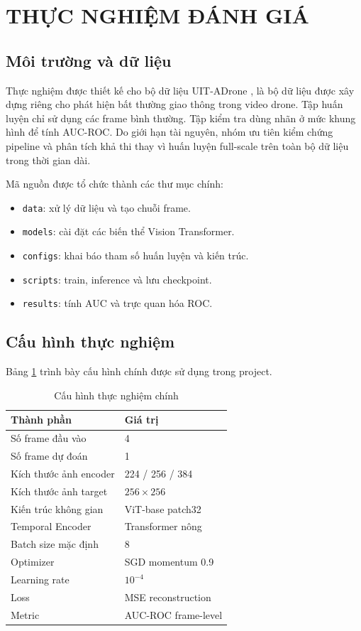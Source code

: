 \section{THỰC NGHIỆM ĐÁNH GIÁ}

\subsection{Môi trường và dữ liệu}

Thực nghiệm được thiết kế cho bộ dữ liệu UIT-ADrone \cite{c2}, là bộ dữ liệu được xây dựng riêng cho phát hiện bất thường giao thông trong video drone. Tập huấn luyện chỉ sử dụng các frame bình thường. Tập kiểm tra dùng nhãn ở mức khung hình để tính AUC-ROC. Do giới hạn tài nguyên, nhóm ưu tiên kiểm chứng pipeline và phân tích khả thi thay vì huấn luyện full-scale trên toàn bộ dữ liệu trong thời gian dài.

Mã nguồn được tổ chức thành các thư mục chính:
\begin{itemize}
    \item \texttt{data}: xử lý dữ liệu và tạo chuỗi frame.
    \item \texttt{models}: cài đặt các biến thể Vision Transformer.
    \item \texttt{configs}: khai báo tham số huấn luyện và kiến trúc.
    \item \texttt{scripts}: train, inference và lưu checkpoint.
    \item \texttt{results}: tính AUC và trực quan hóa ROC.
\end{itemize}

\subsection{Cấu hình thực nghiệm}

Bảng \ref{tab:config} trình bày cấu hình chính được sử dụng trong project.

\begin{table}[h]
\centering
\caption{Cấu hình thực nghiệm chính}
\label{tab:config}
\begin{tabular}{ll}
\hline
\textbf{Thành phần} & \textbf{Giá trị} \\
\hline
Số frame đầu vào & 4 \\
Số frame dự đoán & 1 \\
Kích thước ảnh encoder & 224 / 256 / 384 \\
Kích thước ảnh target & $256 \times 256$ \\
Kiến trúc không gian & ViT-base patch32 \\
Temporal Encoder & Transformer nông \\
Batch size mặc định & 8 \\
Optimizer & SGD momentum 0.9 \\
Learning rate & $10^{-4}$ \\
Loss & MSE reconstruction \\
Metric & AUC-ROC frame-level \\
\hline
\end{tabular}
\end{table}


